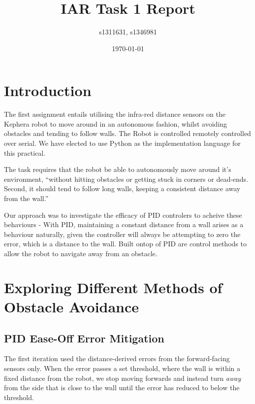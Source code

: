 \documentclass[11pt,a4wide]{article}
\begin{document}
\title{IAR Task 1 Report}
\author{s1311631, s1346981}
\date{\today}
\maketitle


\section{Introduction}

The first assignment entails utilising the infra-red distance sensors on the Kephera 
robot to move around in an autonomous fashion, whilst avoiding obstacles and tending 
to follow walls. The Robot is controlled remotely controlled over serial. We have 
elected to use Python as the implementation language for this practical.

The task requires that the robot be able to autonomously move around it's environment,
``without hitting obstacles or getting stuck in corners or dead-ends. Second, it should 
tend to follow long walls, keeping a consistent distance away from the wall.''

Our approach was to investigate the efficacy of PID controlers to acheive 
these behaviours - With PID, maintaining a constant distance from a wall arises as
a behaviour naturally, given the controller will always be attempting to zero the 
error, which is a distance to the wall. Built ontop of PID are control methods to
allow the robot to navigate away from an obstacle.


\section{Exploring Different Methods of Obstacle Avoidance}

\subsection{PID Ease-Off Error Mitigation}


The first iteration used the distance-derived errors from the forward-facing 
sensors only. When the error passes a set threshold, where the wall is within a 
fixed distance from the robot, we stop moving forwards and instead turn \emph{away} 
from the side that is close to the wall until the error has reduced to below the 
threshold.
\end{document}
